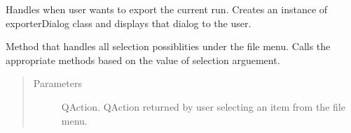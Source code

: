 \documentclass[letterpaper,10pt,english]{sphinxmanual}
\begin{document}
\begin{fulllineitems}

\begin{fulllineitems}
\label{\detokenize{polo.windows:polo.windows.main_window.MainWindow.handle_export}}
Handles when user wants to export the current run. Creates an instance
of exporterDialog class and displays that dialog to the user.

\end{fulllineitems}


\begin{fulllineitems}
\label{\detokenize{polo.windows:polo.windows.main_window.MainWindow.handle_file_menu}}
Method that handles all selection possiblities under
the file menu. Calls the appropriate methods based on the
value of selection arguement.
\begin{quote}\begin{description}
\item[{Parameters}] \leavevmode
{} \textendash{} QAction. QAction returned by user selecting an item            from the file menu.

\end{description}\end{quote}

\end{fulllineitems}


\begin{fulllineitems}
\label{\detokenize{polo.windows:polo.windows.main_window.MainWindow.handle_help_menu}}
\end{fulllineitems}



\end{fulllineitems}
\end{document}

